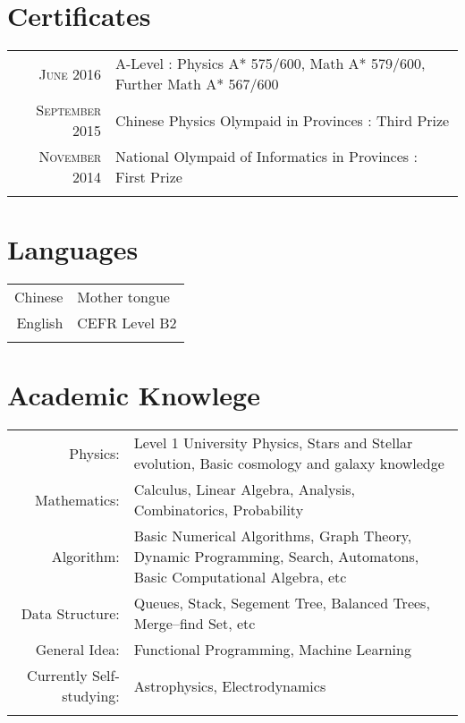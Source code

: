 \documentclass[a4paper,10pt]{article} %
\begin{document}

\section{Certificates}

\begin{tabular}{rl}

\textsc{June} 2016 & {A-Level} : Physics A* 575/600, 
 Math A* 579/600,     Further Math A* 567/600  \\
 
  \textsc{September} 2015 & {Chinese Physics Olympaid in Provinces} : Third Prize \\
  
 \textsc{November} 2014 & {National Olympaid of Informatics in Provinces} : First Prize \\
& \\
\end{tabular}



\section{Languages}
\begin{tabular}{r p{9cm}}
Chinese & Mother tongue\\
English & CEFR Level B2\\
& \\
\end{tabular}

\section{Academic Knowlege}
\begin{tabular}{r p{9cm}}

Physics: & Level 1 University Physics, Stars and Stellar evolution, Basic cosmology and galaxy knowledge\\
Mathematics: & Calculus, Linear Algebra, Analysis, Combinatorics, Probability \\
Algorithm: & Basic Numerical Algorithms, Graph Theory, Dynamic Programming, Search, Automatons, Basic Computational Algebra, etc\\
Data Structure: & Queues, Stack, Segement Tree, Balanced Trees, Merge–find Set, etc\\


General Idea: & Functional Programming, Machine Learning\\

Currently Self-studying: & Astrophysics, Electrodynamics \\
&\\
\end{tabular}
\end{document}
